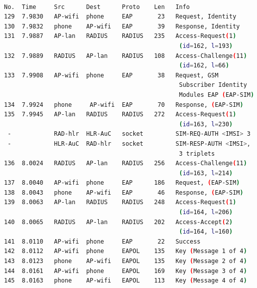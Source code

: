 \documentclass[12pt,a4paper,english]{tutthesis}
\begin{document}
\begin{otherlanguage}{english}

\begin{lstlisting}[language=bash,label=eap-sim-capture,caption={Successful EAP-SIM Authentication}]

No.  Time     Src      Dest      Proto    Len   Info                                  
129  7.9830   AP-wifi  phone     EAP       23   Request, Identity                     
130  7.9832   phone    AP-wifi   EAP       39   Response, Identity                    
131  7.9887   AP-lan   RADIUS    RADIUS   235   Access-Request(1) 
                                                 (id=162, l=193)     
132  7.9889   RADIUS   AP-lan    RADIUS   108   Access-Challenge(11) 
                                                 (id=162, l=66)   
133  7.9908   AP-wifi  phone     EAP       38   Request, GSM 
                                                 Subscriber Identity 
                                                 Modules EAP (EAP-SIM)                 
134  7.9924   phone     AP-wifi  EAP       70   Response, (EAP-SIM)                 
135  7.9945   AP-lan   RADIUS    RADIUS   272   Access-Request(1)
                                                 (id=163, l=230)     
 -            RAD-hlr  HLR-AuC   socket         SIM-REQ-AUTH <IMSI> 3                 
 -            HLR-AuC  RAD-hlr   socket         SIM-RESP-AUTH <IMSI>,
                                                 3 triplets      
136  8.0024   RADIUS   AP-lan    RADIUS   256   Access-Challenge(11)
                                                 (id=163, l=214)  
137  8.0040   AP-wifi  phone     EAP      186   Request, (EAP-SIM) 
138  8.0043   phone    AP-wifi   EAP       46   Response, (EAP-SIM) 
139  8.0063   AP-lan   RADIUS    RADIUS   248   Access-Request(1)
                                                 (id=164, l=206)     
140  8.0065   RADIUS   AP-lan    RADIUS   202   Access-Accept(2)
                                                 (id=164, l=160)      
141  8.0110   AP-wifi  phone     EAP       22   Success                          
142  8.0112   AP-wifi  phone     EAPOL    135   Key (Message 1 of 4)                  
143  8.0123   phone    AP-wifi   EAPOL    135   Key (Message 2 of 4)                  
144  8.0161   AP-wifi  phone     EAPOL    169   Key (Message 3 of 4)                  
145  8.0163   phone    AP-wifi   EAPOL    113   Key (Message 4 of 4)     
\end{lstlisting}




\end{otherlanguage}
\end{document}
